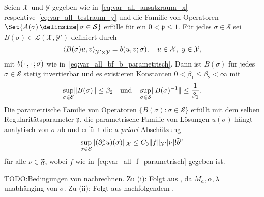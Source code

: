 \begin{Satz}
\label{thm:kunoth:theorem21}
    Seien $\mathcal X$ und $\mathcal Y$ gegeben wie in~\eqref{eq:var_all_ansatzraum_x} respektive~\eqref{eq:var_all_testraum_y} und die Familie von Operatoren $\Set{ A(\sigma) \given \sigma \in \mathcal S }$ erfülle  für ein $0 < \mathfrak p \leq 1$.
    Für jedes $\sigma \in \mathcal S$ sei $B(\sigma) \in \mathcal L(\mathcal X, \mathcal Y')$ definiert durch
    \begin{equation}
        \label{eq:var_all_gross_b_parametrisch}
        \left\langle B(\sigma) u,v\right\rangle_{\mathcal Y' \times \mathcal Y} = b(u, v; \sigma), \quad u \in \mathcal X,~y \in \mathcal Y,
    \end{equation}
    mit $b({\mkern2mu\cdot\mkern2mu}, {\mkern2mu\cdot\mkern2mu}; \sigma)$ wie in~\eqref{eq:var_all_bf_b_parametrisch}.
    Dann ist $B(\sigma)$ für jedes $\sigma \in \mathcal S$ stetig invertierbar und es existieren Konstanten $0 < \beta_{1} \leq \beta_{2} < \infty$ mit
    \begin{equation}
        \label{eq:var_all_norm_B_und_B_inv_parametrisch}
        \sup_{\sigma \in \mathcal S} \lVert B(\sigma)\rVert \leq \beta_{2} \quad \text{und} \quad  \sup_{\sigma \in \mathcal S} \lVert B(\sigma)^{-1}\rVert \leq \frac{1}{\beta_{1}}.
    \end{equation}
    Die parametrische Familie von Operatoren $\{ B(\sigma) : \sigma \in \mathcal S \}$ erfüllt  mit dem selben Regularitätsparameter $\mathfrak p$, die parametrische Familie von Lösungen $u(\sigma)$ hängt analytisch von $\sigma$ ab und erfüllt die \emph{a priori}-Abschätzung
    \begin{equation}
        \label{eq:var_all_a_priori_schranke}
        \sup_{\sigma \in \mathcal S} \lVert(\partial^{\nu}_{\sigma} u)(\sigma)\rVert_{\mathcal X} \leq C_{0} \lVert f\rVert_{\mathcal Y'} \lvert\nu\rvert! \tilde{b}^{\nu}
    \end{equation}
    für alle $\nu \in \mathfrak F$, wobei $f$ wie in~\eqref{eq:var_all_f_parametrisch} gegeben ist.

    \begin{Beweis}
        TODO:\@ Bedingungen von  nachrechnen.
        Zu (i): Folgt aus , da $M_{a}, \alpha, \lambda$ unabhänging von $\sigma$.
        Zu (ii): Folgt aus nachfolgendem .
    \end{Beweis}
\end{Satz}

